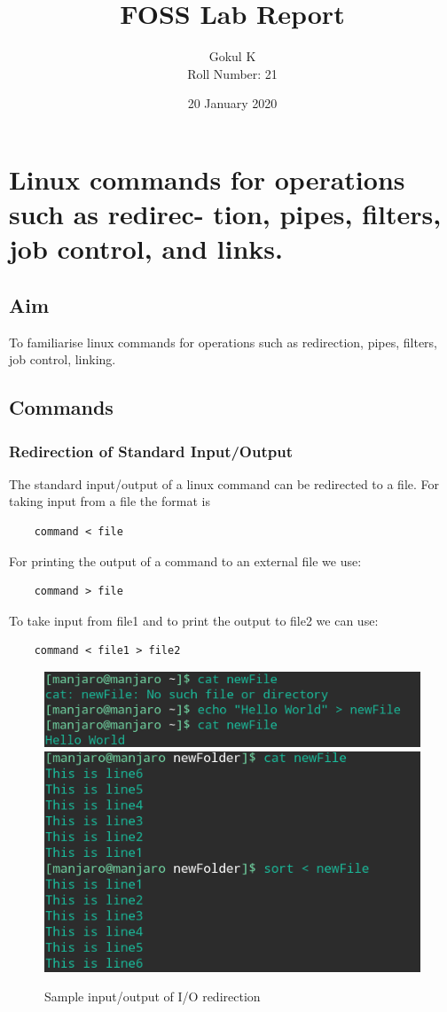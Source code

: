 \documentclass{article}
\begin{document}
\title{FOSS Lab Report}
\author{Gokul K\\[2\baselineskip]
Roll Number: 21\\[2\baselineskip]}
\date{20 January 2020}

\maketitle

\setcounter{section}{1}
\section{Linux commands for operations such as redirec-
tion, pipes, filters, job control, and links.}
\subsection{Aim}
To familiarise linux commands for operations such as redirection, pipes, filters, job control, linking.
\subsection{Commands}
\subsubsection{Redirection of Standard Input/Output}
The standard input/output of a linux command can be redirected to a file. For taking input from a file the format is \begin{verbatim}
    command < file
\end{verbatim}
For printing the output of a command to an external file we use:
\begin{verbatim}
    command > file
\end{verbatim}
To take input from file1 and to print the output to file2 we can use:
\begin{verbatim}
    command < file1 > file2
\end{verbatim}
\begin{figure}[h]
    \centering
    \includegraphics[width=.80\textwidth]{img/p2/ss1.png}
    \includegraphics[width=.80\textwidth]{img/p2/ss2.png}
    \caption{Sample input/output of I/O redirection}
\end{figure}
    
\end{document}
